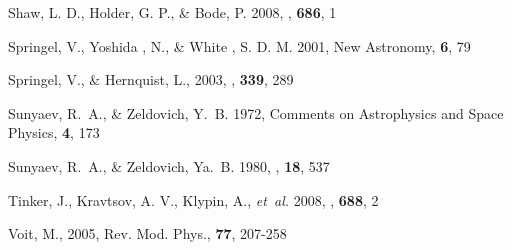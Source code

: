 \documentclass[twocolumn,traditabstract]{aa}
\begin{document}
\begin{thebibliography}{81}
Shaw, L. D., Holder, G. P., \& Bode, P. 2008, \apj, \textbf{686}, 1
 
{Springel}, V., Yoshida , N., \& White , S. D. M. 2001, New Astronomy, \textbf{6}, 79

{Springel}, V., \& Hernquist, L., 2003, \mnras, \textbf{339}, 289
  
Sunyaev, R.~A., \& Zeldovich, Y.~B. 1972, Comments on Astrophysics and Space
  Physics, \textbf{4}, 173
  
Sunyaev, R.~A., \& Zeldovich, {\relax Ya}.~B. 1980, \araa, \textbf{18}, 537

{Tinker}, J., {Kravtsov}, A. V., {Klypin}, A., \emph{et~al.} 2008, \apj, \textbf{688}, 2

Voit, M., 2005, Rev. Mod. Phys., \textbf{77}, 207-258

\end{thebibliography}
\end{document}
